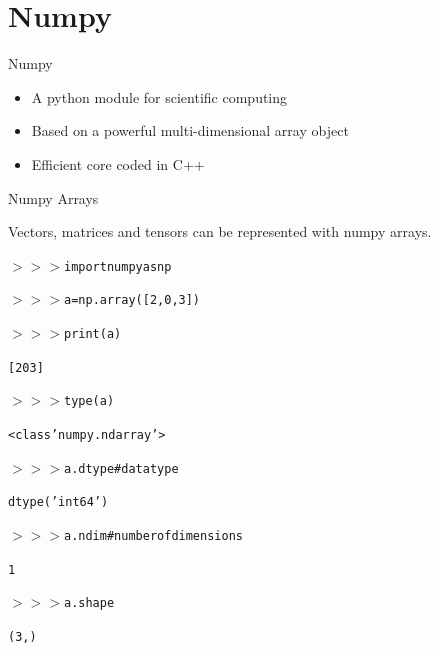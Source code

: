 \documentclass[xcolor=pdftex,dvipsnames,table,mathserif]{beamer}
\begin{document}


\section{Numpy}

\begin{frame}{Numpy}

\begin{itemize}
\item A python module for scientific computing
\item Based on a powerful multi-dimensional array object
\item Efficient core coded in C++
\end{itemize}

\end{frame}


\begin{frame}{Numpy Arrays}

  Vectors, matrices and tensors can be represented with numpy arrays.

  \begin{block}{}
  \begin{alltt}
    $>>>$ import numpy as np

    $>>>$ a = np.array([2, 0, 3])

    $>>>$ print(a)

    [2 0 3]

    $>>>$ type(a)

    <class 'numpy.ndarray'>

    $>>>$ a.dtype  \# data type

    dtype('int64')

    $>>>$ a.ndim  \# number of dimensions

    1

    $>>>$ a.shape

    (3, )


  \end{alltt}
  \end{block}

\end{frame}
\end{document}
